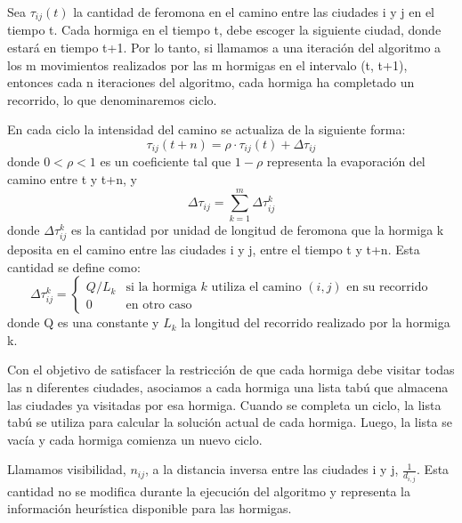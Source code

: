 \documentclass{article}
\begin{document}
Sea $\tau_{ij}(t)$ la cantidad de feromona en el camino entre las ciudades i y j en el tiempo t.
Cada hormiga en el tiempo t, debe escoger la siguiente ciudad, donde estará en tiempo t+1.
Por lo tanto, si llamamos a una iteración del algoritmo a los m movimientos realizados por las m hormigas en el intervalo (t, t+1), 
entonces cada n iteraciones del algoritmo, cada hormiga ha completado un recorrido, lo que denominaremos ciclo.

En cada ciclo la intensidad del camino se actualiza de la siguiente forma:
\begin{equation}
    \tau_{ij}(t+n) = \rho \cdot \tau_{ij}(t) + \Delta \tau_{ij}
\end{equation}
donde $0 < \rho < 1$ es un coeficiente tal que $1 - \rho$ representa la evaporación del camino entre t y t+n, y
\begin{equation}
   \Delta \tau_{ij} = \sum_{k=1}^{m} \Delta \tau_{ij}^k
\end{equation}
donde $\Delta \tau_{ij}^k$ es la cantidad por unidad de longitud de feromona que la hormiga k deposita en el camino entre las ciudades i y j, 
entre el tiempo t y t+n.
Esta cantidad se define como:
\begin{equation}
    \Delta \tau_{ij}^k = \begin{cases}
    Q / L_k & \text{si la hormiga } k \text{ utiliza el camino } (i, j) \text{ en su recorrido}\\
    0 & \text{en otro caso}
    \end{cases}
\end{equation}
donde Q es una constante y $L_k$ la longitud del recorrido realizado por la hormiga k.

Con el objetivo de satisfacer la restricción de que cada hormiga debe visitar todas las n diferentes ciudades, asociamos a cada hormiga
una lista tabú que almacena las ciudades ya visitadas por esa hormiga.
Cuando se completa un ciclo, la lista tabú se utiliza para calcular la solución actual de cada hormiga.
Luego, la lista se vacía y cada hormiga comienza un nuevo ciclo.

Llamamos visibilidad, $n_{ij}$, a la distancia inversa entre las ciudades i y j, $\frac{1}{d_{i,j}}$. 
Esta cantidad no se modifica durante la ejecución del algoritmo y representa la información heurística disponible para las hormigas.
\end{document}
